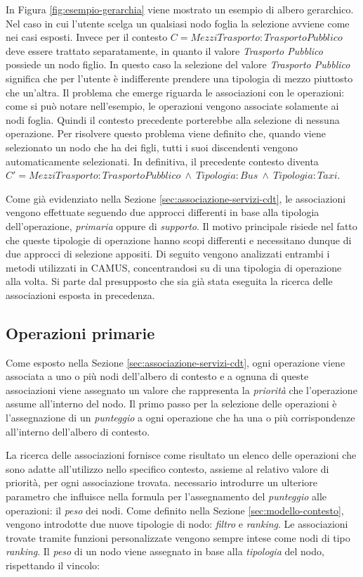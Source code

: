 In Figura \ref{fig:esempio-gerarchia} viene mostrato un esempio di albero gerarchico. Nel caso in cui l'utente scelga un qualsiasi nodo foglia la selezione avviene come nei casi esposti. Invece per il contesto $ C = MezziTrasporto: TrasportoPubblico $ deve essere trattato separatamente, in quanto il valore \emph{Trasporto Pubblico} possiede un nodo figlio. In questo caso la selezione del valore \emph{Trasporto Pubblico} significa che per l'utente è indifferente prendere una tipologia di mezzo piuttosto che un'altra. Il problema che emerge riguarda le associazioni con le operazioni: come si può notare nell'esempio, le operazioni vengono associate solamente ai nodi foglia. Quindi il contesto precedente porterebbe alla selezione di nessuna operazione. Per risolvere questo problema viene definito che, quando viene selezionato un nodo che ha dei figli, tutti i suoi discendenti vengono automaticamente selezionati. In definitiva, il precedente contesto diventa $ C' = MezziTrasporto: TrasportoPubblico\ \land\ Tipologia: Bus\ \land\ Tipologia: Taxi $.

Come già evidenziato nella Sezione \ref{sec:associazione-servizi-cdt}, le associazioni vengono effettuate seguendo due approcci differenti in base alla tipologia dell'operazione, \emph{primaria} oppure di \emph{supporto}. Il motivo principale risiede nel fatto che queste tipologie di operazione hanno scopi differenti e necessitano dunque di due approcci di selezione appositi. Di seguito vengono analizzati entrambi i metodi utilizzati in CAMUS, concentrandosi su di una tipologia di operazione alla volta. Si parte dal presupposto che sia già stata eseguita la ricerca delle associazioni esposta in precedenza.

\subsection*{Operazioni primarie}

Come esposto nella Sezione \ref{sec:associazione-servizi-cdt}, ogni operazione viene associata a uno o più nodi dell'albero di contesto e a ognuna di queste associazioni viene assegnato un valore che rappresenta la \emph{priorità} che l'operazione assume all'interno del nodo. Il primo passo per la selezione delle operazioni è l'assegnazione di un \emph{punteggio} a ogni operazione che ha una o più corrispondenze all'interno dell'albero di contesto. 

La ricerca delle associazioni fornisce come risultato un elenco delle operazioni che sono adatte all'utilizzo nello specifico contesto, assieme al relativo valore di priorità, per ogni associazione trovata. \upe necessario introdurre un ulteriore parametro che influisce nella formula per l'assegnamento del \emph{punteggio} alle operazioni: il \emph{peso} dei nodi. Come definito nella Sezione \ref{sec:modello-contesto}, vengono introdotte due nuove tipologie di nodo: \emph{filtro} e \emph{ranking}. Le associazioni trovate tramite funzioni personalizzate vengono sempre intese come nodi di tipo \emph{ranking}. Il \emph{peso} di un nodo viene assegnato in base alla \emph{tipologia} del nodo, rispettando il vincolo:

